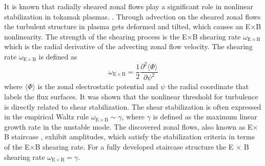 \documentclass[aip, amsmath, amssymb, reprint, twocolumn]{revtex4-1}
\begin{document}


It is known that radially sheared zonal flows play a significant role in nonlinear stabilization in tokamak plasmas. \cite{WACooper1988,doi:10.1063/1.859529,doi:10.1063/1.873896}. 
Through advection on the sheared zonal flows the turbulent structure in plasma gets deformed and tilted, which causes an E$\times$B nonlinearity. \cite{doi:10.1063/1.859529, doi:10.1063/1.871313, doi:10.1063/1.872367}
The strength of the shearing process is the E$\times$B shearing rate $\omega_{\mathrm{E \times B}}$ which is the radial derivative of the advecting zonal flow velocity. \cite{doi:10.1063/1.871313, doi:10.1063/1.872847}
The shearing rate $\omega_{\mathrm{E \times B}}$ is defined as 
\begin{equation}
	\omega_{\mathrm{E \times B}} = \frac{1}{2} \frac{\partial^2 \langle \Phi \rangle}{\partial \psi^2}
	\label{eq:shearingrate}
\end{equation}
where $\langle \Phi \rangle$ is the zonal electrostatic potential and $\psi$ the radial coordinate that labels the flux surfaces. \cite{doi:10.1063/1.4952621, doi:10.1063/1.3005380}
It was shown that the nonlinear threshold for turbulence is directly related to shear stabilization. \cite{doi:10.1063/1.873896} 
The shear stabilization is often expressed in the empirical Waltz rule $\omega_{\mathrm{E \times B}} \sim \gamma$, \cite{doi:10.1063/1.870934, doi:10.1063/1.872847} where $\gamma$ is defined as the maximum linear growth rate in the unstable mode. The discovered zonal flows, also known as E$\times$B staircase \cite{PhysRevE.82.025401}, exhibit amplitudes, which satisfy the stabilization criteria in terms of the E$\times$B shearing rate. For a fully developed staircase structure the E $\times$ B shearing rate $\omega_{\mathrm{E \times B}} = \gamma$. \cite{doi:10.1063/1.4961231, doi:10.1063/1.4952621}\bigskip


\end{document}
